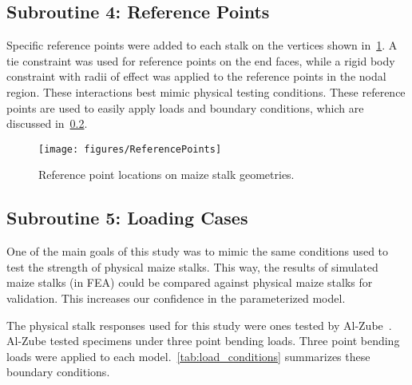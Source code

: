 \subsection{Subroutine 4: Reference Points}
\label{ssec:subroutine_4_reference_points}
Specific reference points were added to each stalk on the vertices shown in~\cref{fig:ReferencePoints}. A tie constraint was used for reference points on the end faces, while a rigid body constraint with radii of effect was applied to the reference points in the nodal region. These interactions best mimic physical testing conditions. These reference points are used to easily apply loads and boundary conditions, which are discussed in~\cref{ssec:subroutine_5_loading_cases}.
\newline
\newline

\begin{figure}[htbp]
	\centering
	\texttt{[image: figures/ReferencePoints]}
	\caption[Reference point locations on maize stalk geometries.]{Reference point locations on maize stalk geometries.}
	\label{fig:ReferencePoints}
\end{figure}

\subsection{Subroutine 5: Loading Cases}
\label{ssec:subroutine_5_loading_cases}
One of the main goals of this study was to mimic the same conditions used to test the strength of physical maize stalks. This way, the results of simulated maize stalks (in FEA) could be compared against physical maize stalks for validation. This increases our confidence in the parameterized model.

The physical stalk responses used for this study were ones tested by Al-Zube~. Al-Zube tested specimens under three point bending loads. Three point bending loads were applied to each model.~\cref{tab:load_conditions} summarizes these boundary conditions.


